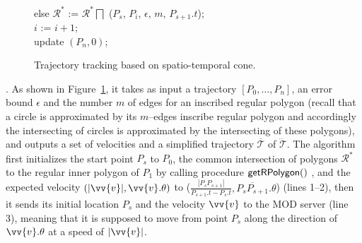 \begin{figure}[tb!]
\begin{center}
{\begin{minipage}{3.3in}
{					\icc \>\hspace{3ex} else $\mathcal{R}^*$ := $\mathcal{R}^*\bigsqcap$ ($P_s$, $P_{i}$, $\epsilon$, $m$, $P_{s+1}.t$); \\
					\icc \>\hspace{3ex} $i$ := $i +1$;	\\
					\icc \>\hspace{0ex} update $(P_{n}, 0)$; 
				}
				\vspace{-2ex}
				\myhrule
			\end{minipage}
		}
	\end{center}
	\vspace{-2ex}
	\caption{\small Trajectory tracking based on spatio-temporal cone.}
	\label{alg:citt-s-full}
	\vspace{-2ex}
\end{figure}

.
As shown in Figure~\ref{alg:citt-s-full}, it takes as input a trajectory ${[P_0, \ldots, P_n]}$, an error bound $\epsilon$ and the number $m$ of edges for an inscribed regular polygon (recall that a circle is approximated by its $m$--edges inscribe regular polygon and accordingly the intersecting of circles is approximated by the intersecting of these polygons), and outputs a set of velocities and a simplified  trajectory $\overline{\mathcal{T}}$ of $\dddot{\mathcal{T}}$.
%
The algorithm first initializes the start point $P_s$ to $P_0$, the common intersection of polygons $\mathcal{R}^*$ to the regular inner polygon of $P_1$ by calling procedure ${\mathsf{getRPolygon}}()$ \cite{Lin:Cised}, and the expected velocity $(|\vv{v}|, \vv{v}.\theta)$ to ($\frac{|P_{s}P_{s+1}|}{P_{s+1}.t-P_s.t},\overline{P_{s}P_{s+1}}.\theta$) (lines 1--2), then it sends its initial location $P_s$ and the velocity $\vv{v}$ to the MOD server (line 3), meaning that it is supposed to move from point $P_s$ along the direction of $\vv{v}.\theta$ at a speed of $|\vv{v}|$.

